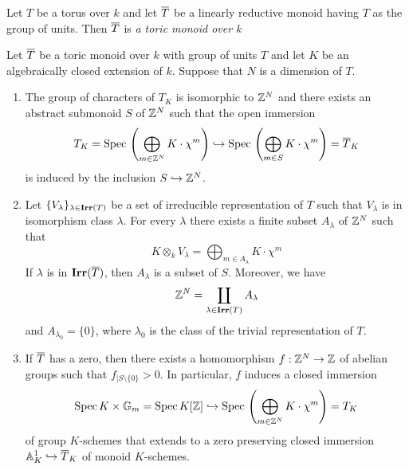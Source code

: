 \begin{definition}
Let $T$ be a torus over $k$ and let $\overline{T}$ be a linearly reductive monoid having $T$ as the group of units. Then $\overline{T}$ is \textit{a toric monoid over $k$}
\end{definition}

\begin{theorem}\label{theorem:toric_monoids_properties_Kempf_torus}
Let $\overline{T}$ be a toric monoid over $k$ with group of units $T$ and let $K$ be an algebraically closed extension of $k$. Suppose that $N$ is a dimension of $T$.
\begin{enumerate}[label=\emph{\textbf{(\arabic*)}}, leftmargin=3.0em]
\item The group of characters of $T_K$ is isomorphic to ${\mathbb Z}^N$ and there exists an abstract submonoid $S$ of ${\mathbb Z}^N$ such that the open immersion
$$T_K = \mathrm{Spec}\,\left(\bigoplus_{m\in {\mathbb Z}^N}K\cdot \chi^m\right) \hookrightarrow \mathrm{Spec}\,\left(\bigoplus_{m\in S}K\cdot \chi^m\right) = \overline{T}_K$$
is induced by the inclusion $S\hookrightarrow {\mathbb Z}^N$.
\item Let $\{V_{\lambda}\}_{\lambda\in \mathbf{Irr}(T)}$ be a set of irreducible representation of $T$ such that $V_{\lambda}$ is in isomorphism class $\lambda$. For every $\lambda$ there exists a finite subset $A_{\lambda}$ of ${\mathbb Z}^N$ such that
$$K\otimes_kV_{\lambda} = \bigoplus_{m\in A_{\lambda}}K\cdot \chi^m$$
If $\lambda$ is in  $\mathbf{Irr}(\overline{T})$, then $A_{\lambda}$ is a subset of $S$. Moreover, we have
$${\mathbb Z}^N = \coprod_{\lambda\in \mathbf{Irr}(T)}A_{\lambda}$$
and $A_{\lambda_0} = \{0\}$, where $\lambda_0$ is the class of the trivial representation of $T$.
\item If $\overline{T}$ has a zero, then there exists a homomorphism $f:{\mathbb Z}^N\rightarrow {\mathbb Z}$ of abelian groups such that $f_{\mid S\setminus \{0\}}>0$. In particular, $f$ induces a closed immersion
$$\mathrm{Spec}\, K\times \mathbb{G}_{m} = \mathrm{Spec}\, K[{\mathbb Z}]\hookrightarrow \mathrm{Spec}\, \left(\bigoplus_{m\in {\mathbb Z}^N}K\cdot \chi^m\right) = T_K$$
of group $K$-schemes that extends to a zero preserving closed immersion $\mathbb{A}^1_K\hookrightarrow \overline{T}_K$ of monoid $K$-schemes.
\end{enumerate}
\end{theorem}
